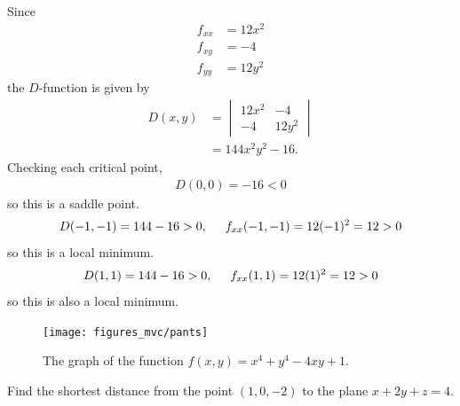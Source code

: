 \documentclass[12pt,letterpaper,reqno]{article}
\numberwithin{equation}{section}
\begin{document}
{\begin{example}
Since
\begin{align*}
	f_{xx}&=12x^2 \\
	f_{xy}&=-4 \\
	f_{yy}&=12y^2
\end{align*}
the $D$-function is given by
\begin{align*}
	D(x,y)&=\begin{vmatrix}
		12x^2 & -4 \\
		-4 & 12y^2
	\end{vmatrix} \\
	&=144x^2y^2-16.
\end{align*}
Checking each critical point,
\begin{align*}
	D(0,0)=-16<0
\end{align*}
so this is a saddle point.
\begin{align*}
	D(-1,-1)=144-16>0, \hspace{0.5cm} f_{xx}(-1,-1)=12(-1)^2=12>0
\end{align*}
so this is a local minimum.
\begin{align*}
	D(1,1)=144-16>0, \hspace{0.5cm} f_{xx}(1,1)=12(1)^2=12>0
\end{align*}
so this is also a local minimum.
\end{example}

\begin{figure}[h]
	\centering
	\texttt{[image: figures\_mvc/pants]}
	\caption{The graph of the function $f(x,y)=x^4+y^4-4xy+1$.}
\end{figure}

\newpage 

\begin{exercise}
Find the shortest distance from the point $(1,0,-2)$ to the plane $x+2y+z=4$.	
\end{exercise}

}
\end{document}
